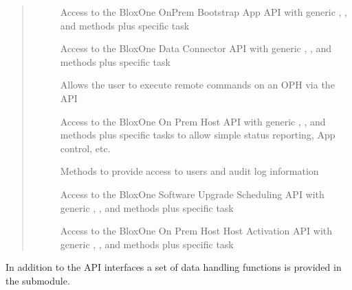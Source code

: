 \documentclass[letterpaper,10pt,english]{sphinxmanual}
\begin{document}
\begin{quote}
\begin{description}
\item[{}] \leavevmode
\sphinxAtStartPar
Access to the BloxOne On\sphinxhyphen{}Prem Bootstrap App API with generic
, ,  and  methods plus specific task

\item[{}] \leavevmode
\sphinxAtStartPar
Access to the BloxOne Data Connector API with generic
, ,  and  methods plus specific task

\item[{}] \leavevmode
\sphinxAtStartPar
Allows the user to execute remote commands on an OPH via the API

\item[{}] \leavevmode
\sphinxAtStartPar
Access to the BloxOne On Prem Host API with generic
, ,  and  methods plus specific tasks
to allow simple status reporting, App control, etc.

\item[{}] \leavevmode
\sphinxAtStartPar
Methods to provide access to users and audit log information

\item[{}] \leavevmode
\sphinxAtStartPar
Access to the BloxOne Software Upgrade Scheduling API with generic
, ,  and  methods plus specific task

\item[{}] \leavevmode
\sphinxAtStartPar
Access to the BloxOne On Prem Host Host Activation API with generic
, ,  and  methods plus specific task

\end{description}
\end{quote}

\sphinxAtStartPar
In addition to the API interfaces a set of data handling functions is provided
in the  sub\sphinxhyphen{}module.
\end{document}
